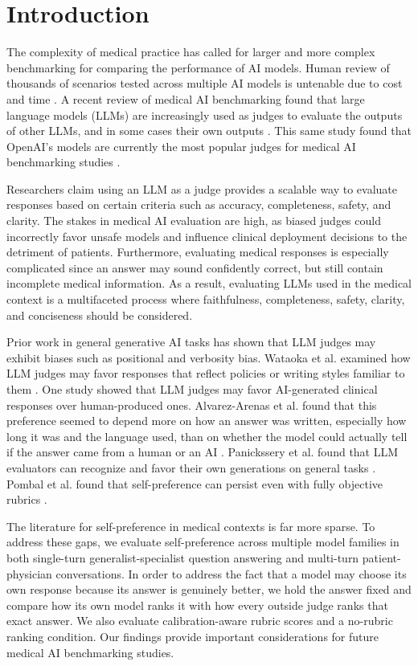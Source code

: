 \documentclass[11pt]{article}
\begin{document}
\section{Introduction}

The complexity of medical practice has called for larger and more complex
benchmarking for comparing the performance of AI models. Human review of
thousands of scenarios tested across multiple AI models is untenable due to
cost and time \cite{zheng2023}. A recent review of medical AI benchmarking
found that large language models (LLMs) are increasingly used as judges to
evaluate the outputs of other LLMs, and in some cases their own outputs
\cite{li2026}. This same study found that OpenAI's models are currently the most
popular judges for medical AI benchmarking studies \cite{li2026}.

Researchers claim using an LLM as a judge provides a scalable way to evaluate
responses based on certain criteria such as accuracy, completeness, safety, and
clarity. The stakes in medical AI evaluation are high, as biased judges could
incorrectly favor unsafe models and influence clinical deployment decisions to
the detriment of patients. Furthermore, evaluating medical responses is
especially complicated since an answer may sound confidently correct, but
still contain incomplete medical information. As a result, evaluating LLMs
used in the medical context is a multifaceted process where faithfulness,
completeness, safety, clarity, and conciseness should be considered.

Prior work in general generative AI tasks has shown that LLM judges may exhibit
biases such as positional and verbosity bias. Wataoka et al. examined how LLM
judges may favor responses that reflect policies or writing styles familiar to
them \cite{wataoka2025}. One study showed that LLM judges may favor
AI-generated clinical responses over human-produced ones. Alvarez-Arenas et
al. found that this preference seemed to depend more on how an answer was
written, especially how long it was and the language used, than on whether the
model could actually tell if the answer came from a human or an AI
\cite{alvarez2026}. Panickssery et al. found that LLM evaluators can recognize
and favor their own generations on general tasks \cite{panickssery2024}.
Pombal et al. found that self-preference can persist even with fully objective
rubrics \cite{pombal2026}.

The literature for self-preference in medical contexts is far more sparse. To
address these gaps, we evaluate self-preference across multiple model families
in both single-turn generalist-specialist question answering and multi-turn
patient-physician conversations. In order to address the fact that a model may
choose its own response because its answer is genuinely better, we hold the
answer fixed and compare how its own model ranks it with how every outside
judge ranks that exact answer. We also evaluate calibration-aware rubric scores
and a no-rubric ranking condition. Our findings provide important
considerations for future medical AI benchmarking studies.
\end{document}

